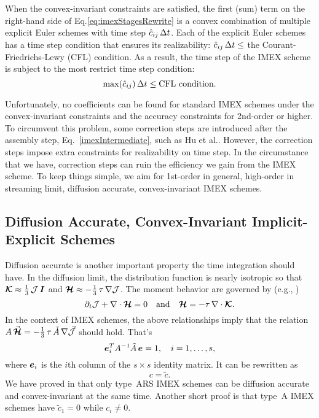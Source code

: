 When the convex-invariant constraints are satisfied, the first (sum) term on the right-hand side of Eq.\eqref{eq:imexStagesRewrite} is a convex combination of multiple explicit Euler schemes with time step $\hat{c}_{ij}\,\Delta t$.
Each of the explicit Euler schemes has a time step condition that ensures its realizability: $\hat{c}_{ij}\,\Delta t\leq$ the Courant-Friedrichs-Lewy (CFL) condition.
As a result, the time step of the IMEX scheme is subject to the most restrict time step condition:
\begin{equation}
\max(\hat{c}_{ij})\,\Delta t \leq \text{CFL condition}.
\end{equation}

Unfortunately, no coefficients can be found for standard IMEX schemes under the convex-invariant constraints and the accuracy constraints for 2nd-order or higher. 
To circumvent this problem, some correction steps are introduced after the assembly step, Eq.~\eqref{imexIntermediate}, such as Hu et al.\cite{hu_etal_2018}.
However, the correction steps impose extra constraints for realizability on time step.
In the circumstance that we have, correction steps can ruin the efficiency we gain from the IMEX scheme.
To keep things simple, we aim for 1st-order in general, high-order in streaming limit, diffusion accurate, convex-invariant IMEX schemes.

\subsection{Diffusion Accurate, Convex-Invariant Implicit-Explicit Schemes}

Diffusion accurate is another important property the time integration should have.
In the diffusion limit, the distribution function is nearly isotropic so that $\boldsymbol{\mathcal{K}}\approx\frac{1}{3}\,\mathcal{J}\,\boldsymbol{I}$ and $\boldsymbol{\mathcal{H}}\approx-\frac{1}{3}\,\tau\,\nabla\mathcal{J}$.
The moment behavior are governed by (e.g., \cite{jinLevermore_1996})
\begin{equation}
  \partial_{t}{\mathcal{J}} + \nabla\cdot\boldsymbol{\mathcal{H}} = 0
  \quad\text{and}\quad
  \boldsymbol{\mathcal{H}} = - \tau\,\nabla\cdot\boldsymbol{\mathcal{K}}.  
  \label{eq:diffusionLimit}
\end{equation}
In the context of IMEX schemes, the above relationships imply that the relation $A\,\vec{\boldsymbol{\mathcal{H}}}=-\frac{1}{3}\,\tau\,\tilde{A}\,\nabla\vec{\mathcal{J}}$ should hold. 
That's
\begin{equation}
   \boldsymbol{e}_{i}^{T}A^{-1}\tilde{A}\,\boldsymbol{e} = 1, \quad i=1,\ldots,s,
\end{equation}
where $\boldsymbol{e}_{i}$ is the $i$th column of the $s\times s$ identity matrix.
It can be rewritten as 
\begin{equation}
c=\tilde{c}.
\end{equation}
We have proved in \cite{chu_etal_2018} that only type~ARS IMEX schemes can be diffusion accurate and convex-invariant at the same time.
Another short proof is that type~A IMEX schemes have $\tilde{c}_1 = 0$ while $c_i \neq 0$.

